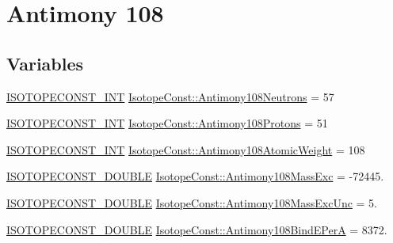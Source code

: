 \hypertarget{group___isotope_const-_antimony-_sb108}{}\section{Antimony 108}
\label{group___isotope_const-_antimony-_sb108}
\subsection*{Variables}
\begin{DoxyCompactItemize}
\item 
\mbox{\hyperlink{group___isotope_const-_macros_ga5f18360b3e99483a35c32d789e62621c}{I\+S\+O\+T\+O\+P\+E\+C\+O\+N\+S\+T\+\_\+\+I\+NT}} \mbox{\hyperlink{group___isotope_const-_antimony-_sb108_ga737ecea0ea13d0bfcfec50e44512a63d}{Isotope\+Const\+::\+Antimony108\+Neutrons}} = 57
\item 
\mbox{\hyperlink{group___isotope_const-_macros_ga5f18360b3e99483a35c32d789e62621c}{I\+S\+O\+T\+O\+P\+E\+C\+O\+N\+S\+T\+\_\+\+I\+NT}} \mbox{\hyperlink{group___isotope_const-_antimony-_sb108_gafe49be5a39f40a00cba0a8fe7591a74c}{Isotope\+Const\+::\+Antimony108\+Protons}} = 51
\item 
\mbox{\hyperlink{group___isotope_const-_macros_ga5f18360b3e99483a35c32d789e62621c}{I\+S\+O\+T\+O\+P\+E\+C\+O\+N\+S\+T\+\_\+\+I\+NT}} \mbox{\hyperlink{group___isotope_const-_antimony-_sb108_ga7abe879f6243cf2b1c17f16a854358e8}{Isotope\+Const\+::\+Antimony108\+Atomic\+Weight}} = 108
\item 
\mbox{\hyperlink{group___isotope_const-_macros_ga8f45a7272ce02c0b4c65c44636ed719a}{I\+S\+O\+T\+O\+P\+E\+C\+O\+N\+S\+T\+\_\+\+D\+O\+U\+B\+LE}} \mbox{\hyperlink{group___isotope_const-_antimony-_sb108_ga4b41950c1a96d8a1ea76c4091c44b818}{Isotope\+Const\+::\+Antimony108\+Mass\+Exc}} = -\/72445.
\item 
\mbox{\hyperlink{group___isotope_const-_macros_ga8f45a7272ce02c0b4c65c44636ed719a}{I\+S\+O\+T\+O\+P\+E\+C\+O\+N\+S\+T\+\_\+\+D\+O\+U\+B\+LE}} \mbox{\hyperlink{group___isotope_const-_antimony-_sb108_ga4746334f55469dfca9826203ecaefe1a}{Isotope\+Const\+::\+Antimony108\+Mass\+Exc\+Unc}} = 5.
\item 
\mbox{\hyperlink{group___isotope_const-_macros_ga8f45a7272ce02c0b4c65c44636ed719a}{I\+S\+O\+T\+O\+P\+E\+C\+O\+N\+S\+T\+\_\+\+D\+O\+U\+B\+LE}} \mbox{\hyperlink{group___isotope_const-_antimony-_sb108_ga83cd1e8d6ba8d4bbb1de9046f9a933c7}{Isotope\+Const\+::\+Antimony108\+Bind\+E\+PerA}} = 8372.
\item 

\end{DoxyCompactItemize}
